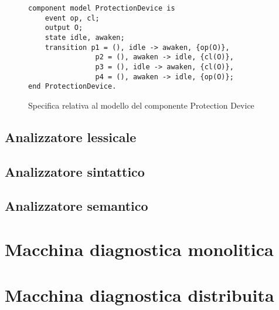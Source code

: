 \begin{figure}[htbp]
\begin{verbatim}
component model ProtectionDevice is
	event op, cl;
	output O;
	state idle, awaken;
	transition p1 = (), idle -> awaken, {op(O)},
				p2 = (), awaken -> idle, {cl(O)},
				p3 = (), idle -> awaken, {cl(O)},
				p4 = (), awaken -> idle, {op(O)};
end ProtectionDevice.
\end{verbatim}
\caption{Specifica relativa al modello del componente Protection Device}
\label{fig:spec_protection}
\end{figure}



\subsection{Analizzatore lessicale}

\subsection{Analizzatore sintattico}

\subsection{Analizzatore semantico}

\section{Macchina diagnostica monolitica}

\section{Macchina diagnostica distribuita}